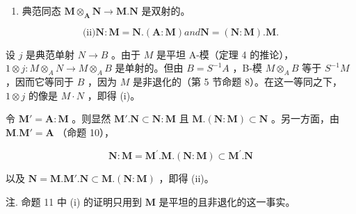\begin{enumerate}
\def\labelenumi{(\roman{enumi})}
\tightlist
\item
  典范同态 \(\mathbf{M} \otimes_{\mathbf{A}} \mathbf{N} \to \mathbf{M}. \mathbf{N}\) 是双射的。
\end{enumerate}

\[
\text {(ii)} \mathbf {N}: \mathbf {M} = \mathbf {N}. (\mathbf {A}: \mathbf {M}) a n d \mathbf {N} = (\mathbf {N}: \mathbf {M}). \mathbf {M}.
\]

设 \(j\) 是典范单射 \(N \to B\) 。由于 \(M\) 是平坦 A-模（定理 4 的推论），\(1 \otimes j \colon M \otimes_{A} N \to M \otimes_{A} B\) 是单射的。但由 \(B = S^{-1}A\) ，B-模 \(M \otimes_{A} B\) 等于 \(S^{-1}M\) ，因而它等同于 \(B\) ，因为 \(M\) 是非退化的（第 5 节命题 8）。在这一等同之下，\(1 \otimes j\) 的像是 \(M \cdot N\) ，即得 (i)。

令 \(\mathbf{M}' = \mathbf{A} : \mathbf{M}\) 。则显然 \(\mathbf{M}' . \mathbf{N} \subset \mathbf{N} : \mathbf{M}\) 且 \(\mathbf{M} . (\mathbf{N} : \mathbf{M}) \subset \mathbf{N}\) 。另一方面，由 \(\mathbf{M} . \mathbf{M}' = \mathbf{A}\) （命题 10），

\[
\mathbf {N}: \mathbf {M} = \mathbf {M} ^ {\prime}. \mathbf {M}. (\mathbf {N}: \mathbf {M}) \subset \mathbf {M} ^ {\prime}. \mathbf {N}
\]

以及 \(\mathbf{N} = \mathbf{M}.\mathbf{M}'.\mathbf{N}\subset \mathbf{M}.(\mathbf{N}:\mathbf{M})\) ，即得 (ii)。

注. 命题 11 中 (i) 的证明只用到 \(\mathbf{M}\) 是平坦的且非退化的这一事实。

